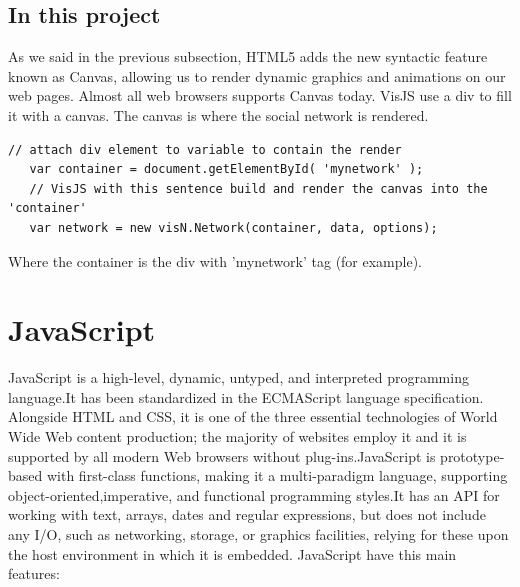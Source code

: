\documentclass[a4paper, 12pt]{book}
\begin{document}
\subsection{In this project}
\label{sec:html5itp}
As we said in the previous subsection, HTML5 adds the new syntactic feature known as Canvas, allowing us to render dynamic graphics and animations on our web pages. Almost all web browsers supports Canvas today.
VisJS use a div to fill it with a canvas. The canvas is where the social network is rendered.
\lstset{language=Java, breaklines=true, basicstyle=\footnotesize}
\begin{lstlisting}[frame=single]
   // attach div element to variable to contain the render
   var container = document.getElementById( 'mynetwork' );
   // VisJS with this sentence build and render the canvas into the 'container'
   var network = new visN.Network(container, data, options);
\end{lstlisting}
Where the container is the div with 'mynetwork' tag (for example).

\section{JavaScript}
\label{sec:js}
JavaScript is a high-level, dynamic, untyped, and interpreted programming language.It has been standardized in the ECMAScript language specification. Alongside HTML and CSS, it is one of the three essential technologies of World Wide Web content production; the majority of websites employ it and it is supported by all modern Web browsers without plug-ins.JavaScript is prototype-based with first-class functions, making it a multi-paradigm language, supporting object-oriented,imperative, and functional programming styles.It has an API for working with text, arrays, dates and regular expressions, but does not include any I/O, such as networking, storage, or graphics facilities, relying for these upon the host environment in which it is embedded. JavaScript have this main features:
\end{document}
